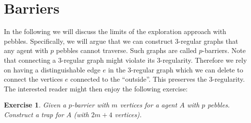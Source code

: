 \documentclass[draft,oneside]{scrartcl}
\newtheorem{ex}{Exercise}
\begin{document}
\section{Barriers}
In the following we will discuss the limits of the exploration approach with
pebbles. Specifically, we will argue that we can construct 3-regular graphs
that any agent with $p$ pebbles cannot traverse. Such graphs are called
$p$-barriers.
Note that connecting a 3-regular graph might violate its 3-regularity.
Therefore we rely on having a distinguishable edge $e$ in the 3-regular graph
which we can delete to connect the vertices $e$ connected to the
\enquote{outside}. This preserves the 3-regularity. The interested reader might
then enjoy the following exercise:
\begin{ex}
  Given a $p$-barrier with $m$ vertices for a agent $A$ with $p$ pebbles.
  Construct a trap for $A$ (with $2m+4$ vertices). 
\end{ex}
\end{document}
